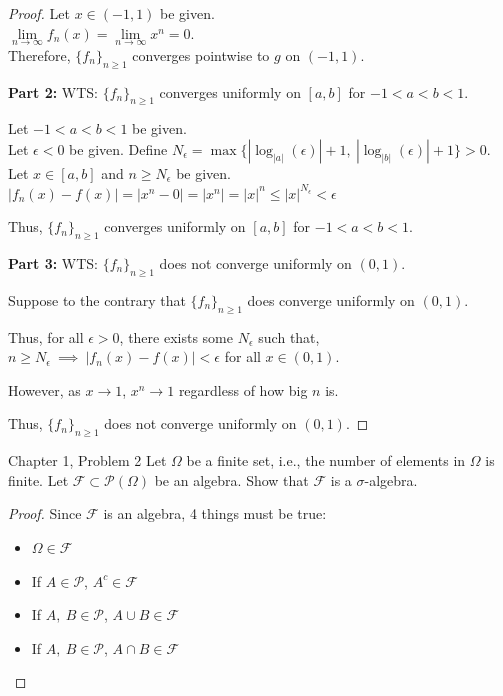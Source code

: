 \documentclass[12pt,letterpaper, onecolumn]{exam}
\newcommand{\power}{\mathcal{P}}
\newcommand{\cutelim}{\lim\limits_{n\to\infty}}
\newcommand{\sigmaF}{\mathcal{F}}
\begin{document}
\begin{questions}
\begin{solution}
\begin{proof}
        Let $x \in (-1, 1)$ be given. \\
        $\cutelim f_n(x) = \cutelim x^n = 0$. \\
        Therefore, $\{f_n\}_{n\geq 1}$ converges pointwise to $g$ on $(-1, 1)$.

        \textbf{Part 2:} WTS: $\{f_n\}_{n\geq 1}$ converges  uniformly on $[a, b]$ for $-1 <a<b<1$.

        Let $-1 <a<b<1$ be given. \\
        Let $\epsilon < 0$ be given. Define $N_\epsilon = \max\{|\log_{|a|}(\epsilon)| + 1,  \:|\log_{|b|}(\epsilon)| + 1\}> 0$. \\
        Let $x \in [a, b]$ and $n \geq N_\epsilon$ be given. \\
        $|f_n(x) - f(x)| = |x^n - 0| = |x^n| = |x|^n \leq |x|^{N_\epsilon} < \epsilon$

        Thus, $\{f_n\}_{n\geq 1}$ converges  uniformly on $[a, b]$ for $-1 <a<b<1$.

        \textbf{Part 3:} WTS: $\{f_n\}_{n\geq 1}$ does not converge uniformly on $(0, 1)$.

        Suppose to the contrary that $\{f_n\}_{n\geq 1}$ does converge uniformly on $(0, 1)$. 

        Thus, for all $\epsilon > 0$, there exists some $N_\epsilon$ such that, $n \geq N_\epsilon \: \implies \: |f_n(x) - f(x)| < \epsilon$ for all $x \in (0, 1)$.

        However, as $x \to 1$, $x^n \to 1$ regardless of how big $n$ is. 

        Thus, $\{f_n\}_{n\geq 1}$ does not converge uniformly on $(0, 1)$.
        \end{proof}
    
    \end{solution}

    \question Chapter 1, Problem 2
    Let $\Omega$ be a finite set, i.e., the number of elements in $\Omega$ is finite. Let $\sigmaF \subset \power(\Omega)$ be an algebra. Show that $\sigmaF$ is a $\sigma$-algebra. 

    \begin{solution}
    \begin{proof}
    Since $\sigmaF$ is an algebra, 4 things must be true:
    \begin{itemize}
        \item[(a)] $\Omega \in \sigmaF$
        \item[(b)] If $A \in \power$, $A^c \in \sigmaF$
        \item[(c)] If $A, \: B \in \power$, $A \cup B \in \sigmaF$
        \item[(c')] If $A, \: B \in \power$, $A \cap B \in \sigmaF$
    \end{itemize}


\end{proof}
\end{solution}
\end{questions}
\end{document}
